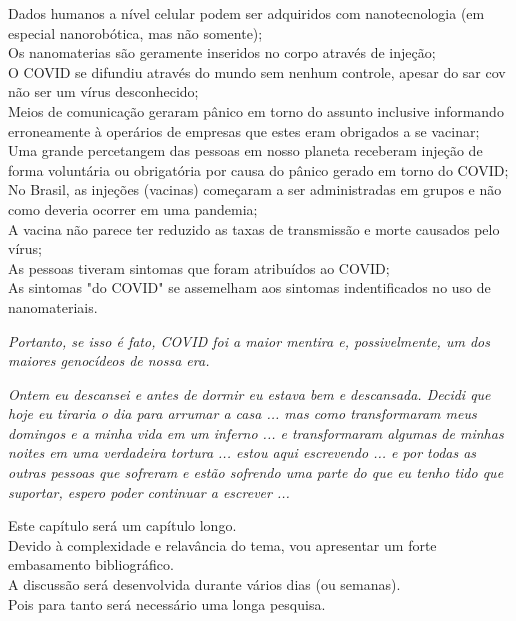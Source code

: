\documentclass[11pt]{book}
\begin{document}
Dados humanos a nível celular podem ser adquiridos com nanotecnologia (em especial nanorobótica, mas não somente); \\

Os nanomaterias são geramente inseridos no corpo através de injeção; \\

O COVID se difundiu através do mundo sem nenhum controle, apesar do sar cov não ser um vírus desconhecido; \\

Meios de comunicação geraram pânico em torno do assunto inclusive informando erroneamente à operários de empresas que estes eram obrigados a se vacinar; \\

Uma grande percetangem das pessoas em nosso planeta receberam injeção de forma voluntária ou obrigatória por causa do pânico gerado em torno do COVID; \\

No Brasil, as injeções (vacinas) começaram a ser administradas em grupos e não como deveria ocorrer em uma pandemia; \\

A vacina não parece ter reduzido as taxas de transmissão e morte causados pelo vírus; \\

As pessoas tiveram sintomas que foram atribuídos ao COVID; \\

As sintomas "do COVID" se assemelham aos sintomas indentificados no uso de nanomateriais. \\

\noindent \begin{center} \emph{Portanto, se isso é fato, COVID foi a maior mentira e, possivelmente, um dos maiores genocídeos de nossa era.} \end{center}

\noindent \begin{center} \emph{Ontem eu descansei e antes de dormir eu estava bem e descansada. Decidi que hoje eu tiraria o dia para arrumar a casa ... mas como transformaram meus domingos e a minha vida em um inferno ... e transformaram algumas de minhas noites em uma verdadeira tortura ... estou aqui escrevendo ... e por todas as outras pessoas que sofreram e estão sofrendo uma parte do que eu tenho tido que suportar, espero poder continuar a escrever ...} \end{center}

Este capítulo será um capítulo longo. \\
Devido à complexidade e relavância do tema, vou apresentar um forte embasamento bibliográfico. \\
A discussão será desenvolvida durante vários dias (ou semanas). \\
Pois para tanto será necessário uma longa pesquisa. \\
\end{document}
